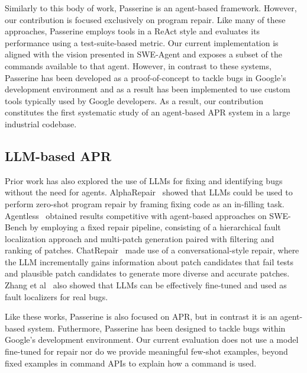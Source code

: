 Similarly to this body of work, Passerine is an agent-based framework. However, our contribution is focused exclusively on program repair. Like many of these approaches, Passerine employs tools in a ReAct style and evaluates its performance using a test-suite-based metric. Our current implementation is aligned with the vision presented in SWE-Agent and exposes a subset of the commands available to that agent. However, in contrast to these systems, Passerine has been developed as a proof-of-concept to tackle bugs in Google’s development environment and as a result has been implemented to use custom tools typically used by Google developers. As a result, our contribution constitutes the first systematic study of  an agent-based APR system in a large industrial codebase.


\subsection{LLM-based APR
}

Prior work has also explored the use of LLMs for fixing and identifying bugs without the need for agents. AlphaRepair~\cite{alpharepair} showed that LLMs could be used to perform zero-shot program repair by framing fixing code as an in-filling task. Agentless~\cite{agentless} obtained results competitive with agent-based approaches on SWE-Bench by employing a fixed repair pipeline, consisting of a hierarchical fault localization approach and multi-patch generation paired with filtering and ranking of patches. ChatRepair~\cite{chatrepair} made use of a conversational-style repair, where the LLM incrementally gains information about patch candidates that fail tests and plausible patch candidates to generate more diverse and accurate patches.
Zhang et al~\cite{yang2024large} also showed that LLMs can be effectively fine-tuned and used as fault localizers for real bugs. 

Like these works, Passerine is also focused on APR, but in contrast it is an agent-based system. Futhermore, Passerine has been designed to tackle bugs within Google’s development environment. Our current evaluation does not use a model fine-tuned for repair nor do we provide meaningful few-shot examples, beyond fixed examples in command APIs to explain how a command is used.
